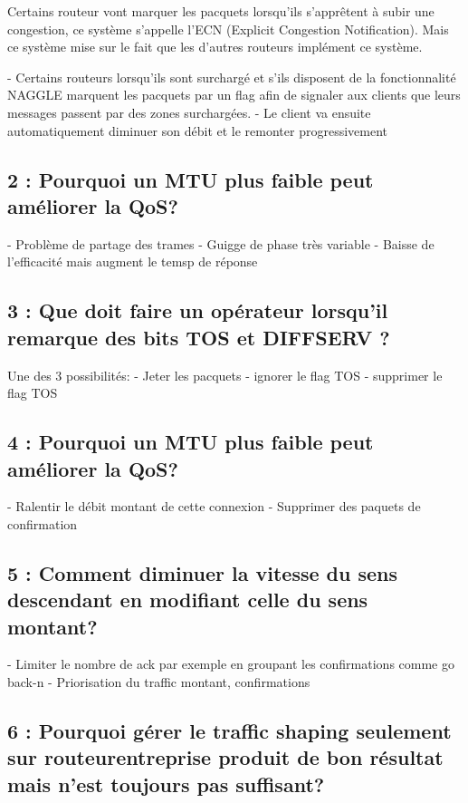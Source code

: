 \documentclass{article}
\begin{document}
Certains routeur vont marquer les pacquets lorsqu'ils s'apprêtent à subir une congestion, ce système s'appelle l'ECN (Explicit Congestion Notification). Mais ce système mise sur le fait que les d'autres routeurs implément ce système. \cite{cours}

- Certains routeurs lorsqu'ils sont surchargé et s'ils disposent de la fonctionnalité NAGGLE marquent les pacquets par un flag afin de signaler aux clients que leurs messages passent par des zones surchargées.
- Le client va ensuite automatiquement diminuer son débit et le remonter progressivement

\subsection{2 : Pourquoi un MTU plus faible peut améliorer la QoS?}

- Problème de partage des trames
- Guigge de phase très variable
- Baisse de l'efficacité mais augment le temsp de réponse

\subsection{3 : Que doit faire un opérateur lorsqu'il remarque des bits TOS et DIFFSERV ?}

Une des 3 possibilités:
- Jeter les pacquets
- ignorer le flag TOS
- supprimer le flag TOS

\subsection{4 : Pourquoi un MTU plus faible peut améliorer la QoS?}

- Ralentir le débit montant de cette connexion
- Supprimer des paquets de confirmation


\subsection{5 : Comment diminuer la vitesse du sens descendant en modifiant celle du sens montant?}

- Limiter le nombre de ack par exemple en groupant les confirmations comme go back-n
- Priorisation du traffic montant, confirmations


\subsection{6 : Pourquoi gérer le traffic shaping seulement sur routeurentreprise produit de bon résultat mais n'est toujours pas suffisant?}
\end{document}
